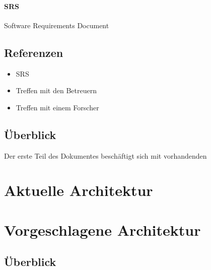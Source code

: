 \documentclass[12pt]{article} %
\begin{document}
	\paragraph{SRS} Software Requirements Document



\subsection{Referenzen}
\begin{itemize}
	\item SRS
	\item Treffen mit den Betreuern
	\item Treffen mit einem Forscher
\end{itemize}


\subsection{Überblick}

Der erste Teil des Dokumentes beschäftigt sich mit vorhandenden 







\section{Aktuelle Architektur}




\section{Vorgeschlagene Architektur}

\subsection{Überblick}
\end{document}
